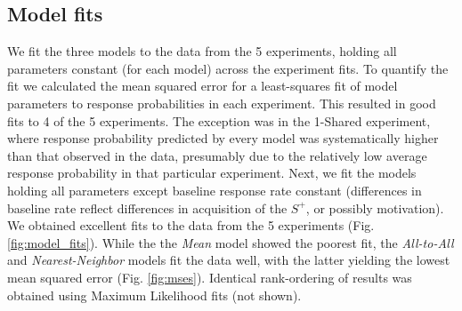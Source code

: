 \subsection*{Model fits}
We fit the three models to the data from the 5 experiments, holding all parameters constant (for each model) across the experiment fits.  
To quantify the fit we calculated the mean squared error for a least-squares fit of model parameters to response probabilities in each experiment.  
This resulted in good fits to 4 of the 5 experiments. 
The exception was in the 1-Shared experiment, where response probability predicted by every model was systematically higher than that observed in the data, presumably due to the relatively low average response probability in that particular experiment.  
Next, we fit the models holding all parameters except baseline response rate constant (differences in baseline rate reflect differences in acquisition of the $S^+$, or possibly motivation). 
We obtained excellent fits to the data from the 5 experiments (Fig. \ref{fig:model_fits}).  
While the the \textit{Mean} model showed the poorest fit, the \textit{All-to-All} and \textit{Nearest-Neighbor} models fit the data well, with the latter yielding the lowest mean squared error (Fig. \ref{fig:mses}).  Identical rank-ordering of results was obtained using Maximum Likelihood fits (not shown).  